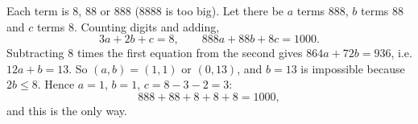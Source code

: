 Each term is $8$, $88$ or $888$ ($8888$ is too big). Let there be $a$ terms $888$, $b$ terms $88$ and $c$ terms $8$. Counting digits and adding,
\[3a+2b+c=8,\qquad 888a+88b+8c=1000.\]
Subtracting $8$ times the first equation from the second gives $864a+72b=936$, i.e. $12a+b=13$. So $(a,b)=(1,1)$ or $(0,13)$, and $b=13$ is impossible because $2b\le8$. Hence $a=1$, $b=1$, $c=8-3-2=3$:
\[\boxed{888+88+8+8+8=1000},\]
and this is the only way.
